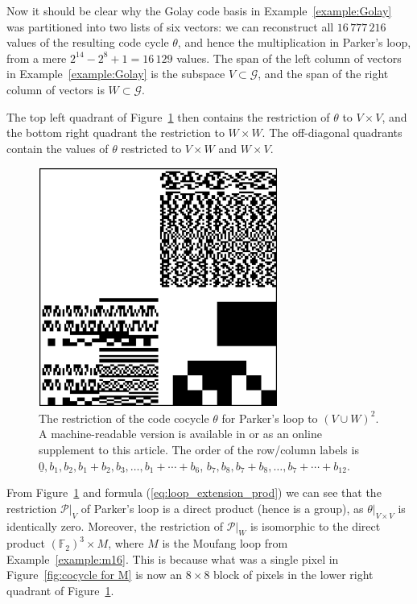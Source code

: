 \documentclass{article}
\theoremstyle{plain}
\theoremstyle{definition}
\def \cG {\mathcal{G}}
\def \cP {\mathcal{P}}
\def \FF {\mathbb{F}}
\begin{document}
Now it should be clear why the Golay code basis in Example~\ref{example:Golay} was partitioned into two lists of six vectors: we can reconstruct all $16\,777\,216$ values of the resulting code cycle $\theta$, and hence the multiplication in Parker's loop, from a mere $2^{14} - 2^8 + 1 = 16\,129$ values.
The span of the left column of vectors in Example~\ref{example:Golay} is the subspace $V\subset \cG$, and the span of the right column of vectors is $W\subset \cG$.

The top left quadrant of Figure~\ref{fig:Parker cocycle} then contains the restriction of $\theta$ to $V\times V$, and the bottom right quadrant the restriction to $W\times W$. 
The off-diagonal quadrants contain the values of $\theta$ restricted to $V\times W$ and $W\times V$.
\begin{figure}[!b]
\begin{center}
\includegraphics[width=0.7\textwidth]{alpha_awesum.png}
\end{center}
\caption{The restriction of the code cocycle $\theta$ for Parker's loop to $(V\cup W)^2$. A machine-readable version is available in \cite{RN_GH} or as an %
online supplement to this article. The order of the row/column labels is $\underline{0},b_1,b_2,b_1+b_2,b_3,\ldots, b_1+\cdots +b_6$, $b_7,b_8,b_7+b_8,\ldots,b_7+\cdots + b_{12}$.}
\label{fig:Parker cocycle}
\end{figure}
From Figure~\ref{fig:Parker cocycle} and formula (\ref{eq:loop_extension_prod}) we can see that the restriction $\cP\big|_V$ of Parker's loop is a direct product (hence is a group), as $\theta\big|_{V\times V}$ is identically zero. 
Moreover, the restriction of $\cP\big|_W$ is isomorphic to the direct product $(\FF_2)^3 \times M$, where $M$ is the Moufang loop from Example~\ref{example:m16}.
This is because what was a single pixel in Figure~\ref{fig:cocycle for M} is now an $8\times 8$ block of pixels in the lower right quadrant of Figure~\ref{fig:Parker cocycle}.
\end{document}
